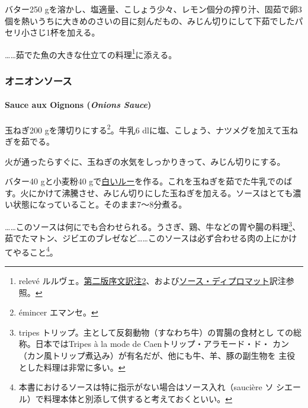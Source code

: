 \begin{recette}
バター250
gを溶かし、塩適量、こしょう少々、レモン\undemi{}個分の搾り汁、固茹で卵3個を熱いうちに大きめのさいの目に刻んだもの、みじん切りにして下茹でしたパセリ小さじ1杯を加える。

\ldots{}\ldots{}茹でた魚の大きな仕立ての料理\footnote{relevé
  ルルヴェ。\protect\hyperlink{releve}{第二版序文訳注2}、および\protect\hyperlink{sauce-diplomate}{ソース・ディプロマット}訳注参照。}に添える。

\maeaki

\hypertarget{ux30aaux30cbux30aaux30f3ux30bdux30fcux30b9}{%
\subsubsection{オニオンソース}\label{ux30aaux30cbux30aaux30f3ux30bdux30fcux30b9}}

\hypertarget{onions-sauce}{%
\paragraph{\texorpdfstring{Sauce aux Oignons (\emph{Onions
Sauce})}{Sauce aux Oignons (Onions Sauce)}}\label{onions-sauce}}


玉ねぎ200 gを薄切りにする\footnote{émincer エマンセ。}。牛乳6
dlに塩、こしょう、ナツメグを加えて玉ねぎを茹でる。

火が通ったらすぐに、玉ねぎの水気をしっかりきって、みじん切りにする。

バター40 gと小麦粉40
gで\protect\hyperlink{roux-blanc}{白いルー}を作る。これを玉ねぎを茹でた牛乳でのばす。火にかけて沸騰させ、みじん切りにした玉ねぎを加える。ソースはとても濃い状態になっていること。そのまま7〜8分煮る。

\ldots{}\ldots{}このソースは何にでも合わせられる。うさぎ、鶏、牛などの胃や腸の料理\footnote{tripes
  トリップ。主として反芻動物（すなわち牛）の胃腸の食材とし
  ての総称。日本ではTripes à la mode de Caenトリップ・アラモード・ド・
  カン（カン風トリップ煮込み）が有名だが、他にも牛、羊、豚の副生物を
  主役とした料理は非常に多い。}、茹でたマトン、ジビエのブレゼなど\ldots{}\ldots{}このソースは必ず合わせる肉の上にかけてやること\footnote{本書におけるソースは特に指示がない場合はソース入れ（saucière
  ソ シエール）で料理本体と別添して供すると考えておくといい。}。


\end{recette}
